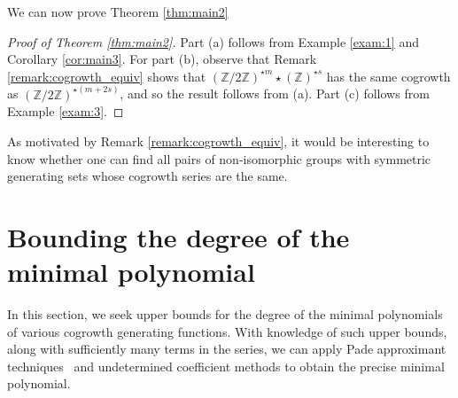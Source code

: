 \documentclass[11pt]{amsart}
\theoremstyle{definition}
\newcommand{\hl}[1]{{\color{blue}\sl \textbf{\underline{H:}} #1}}
\newcommand{\Z}{\mathbb{Z}}
\newcommand{\vecP}{\vec{P}}
\DeclareMathOperator{\Res}{Res}
\newcommand{\ResBar}{\overline{\Res}}
\begin{document}
We can now prove Theorem \ref{thm:main2}
\begin{proof}[Proof of Theorem \ref{thm:main2}] Part (a) follows from Example \ref{exam:1} and Corollary \ref{cor:main3}.  For part (b), observe that Remark \ref{remark:cogrowth_equiv} shows that 
$\left(\mathbb{Z}/2\mathbb{Z}\right)^{\star m} \star \left(\mathbb{Z}\right)^{\star s}$ has the same cogrowth as $\left(\mathbb{Z}/2\mathbb{Z}\right)^{\star(m+2s)}$, and so the result follows from (a). Part (c) follows from Example \ref{exam:3}.
\end{proof}

As motivated by Remark \ref{remark:cogrowth_equiv}, it would be interesting to know whether one can find all pairs of non-isomorphic groups with symmetric generating sets whose cogrowth series are the same.  


\section{Bounding the degree of the minimal polynomial}
\label{sec:bounds}
In this section, we seek upper bounds for the degree of the minimal
polynomials of various cogrowth generating functions. With knowledge
of such upper bounds, along with sufficiently many terms in the series,
we can apply Pade approximant techniques~\cite{aecf} and undetermined
coefficient methods to obtain the precise minimal polynomial.
\end{document}

